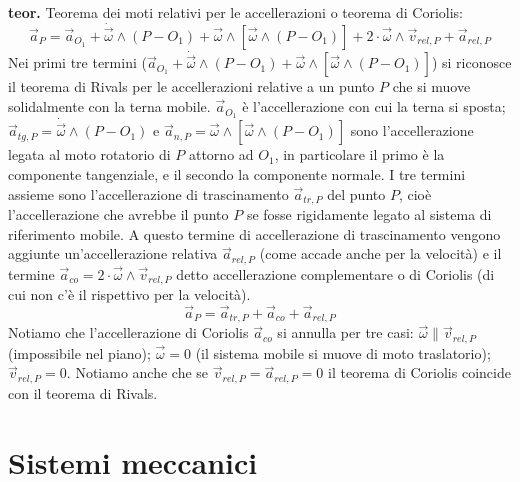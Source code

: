 \textbf{teor.} Teorema dei moti relativi per le accellerazioni o teorema di Coriolis:
\[
    \vec{a}_P = \vec{a}_{O_1} + \dot{\vec{\omega}} \land (P-O_1) + \vec{\omega} \land [\vec{\omega}\land (P-O_1)] + 2 \cdot \vec{\omega}\land \vec{v}_{rel,P} + \vec{a}_{rel,P}
\]
Nei primi tre termini ($\vec{a}_{O_1} + \dot{\vec{\omega}} \land (P-O_1) + \vec{\omega} \land [\vec{\omega}\land (P-O_1)]$) si riconosce il teorema di Rivals per le accellerazioni relative a un punto $P$ che si muove solidalmente con la terna mobile. $\vec{a}_{O_1}$ è l'accellerazione con cui la terna si sposta; $\vec{a}_{tg,P} = \dot{\vec{\omega}} \land (P-O_1)$ e $\vec{a}_{n,P} = \vec{\omega} \land [\vec{\omega}\land (P-O_1)]$ sono l'accellerazione legata al moto rotatorio di $P$ attorno ad $O_1$, in particolare il primo è la componente tangenziale, e il secondo la componente normale. I tre termini assieme sono l'accellerazione di trascinamento $\vec{a}_{tr,P}$ del punto $P$, cioè l'accellerazione che avrebbe il punto $P$ se fosse rigidamente legato al sistema di riferimento mobile.\newline
A questo termine di accellerazione di trascinamento vengono aggiunte un'accellerazione relativa $\vec{a}_{rel,P}$ (come accade anche per la velocità) e il termine $\vec{a}_{co} = 2 \cdot \vec{\omega}\land \vec{v}_{rel,P}$ detto accellerazione complementare o di Coriolis (di cui non c'è il rispettivo per la velocità).
\[
    \vec{a}_P = \vec{a}_{tr,P} + \vec{a}_{co} + \vec{a}_{rel,P}
\]
Notiamo che l'accellerazione di Coriolis $\vec{a}_{co}$ si annulla per tre casi: $\vec{\omega} \parallel \vec{v}_{rel,P}$ (impossibile nel piano); $\vec{\omega} = 0$ (il sistema mobile si muove di moto traslatorio); $\vec{v}_{rel,P} = 0$.\newline
Notiamo anche che se $\vec{v}_{rel,P} = \vec{a}_{rel,P} = 0$ il teorema di Coriolis coincide con il teorema di Rivals.
\section{Sistemi meccanici}